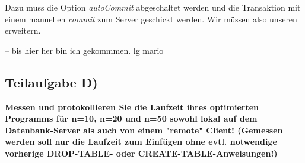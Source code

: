 Dazu muss die Option \textit{autoCommit} abgeschaltet werden und die Transaktion
mit einem manuellen \textit{commit} zum Server geschickt werden. Wir müssen also
unseren  erweitern.

-- bis hier her bin ich gekommmen. lg mario

\subsection{Teilaufgabe D)}
\textbf{Messen und protokollieren Sie die Laufzeit ihres optimierten Programms für n=10, n=20
und n=50 sowohl lokal auf dem Datenbank-Server als auch von einem "remote" Client!
(Gemessen werden soll nur die Laufzeit zum Einfügen ohne evtl. notwendige vorherige
DROP-TABLE- oder CREATE-TABLE-Anweisungen!)}

